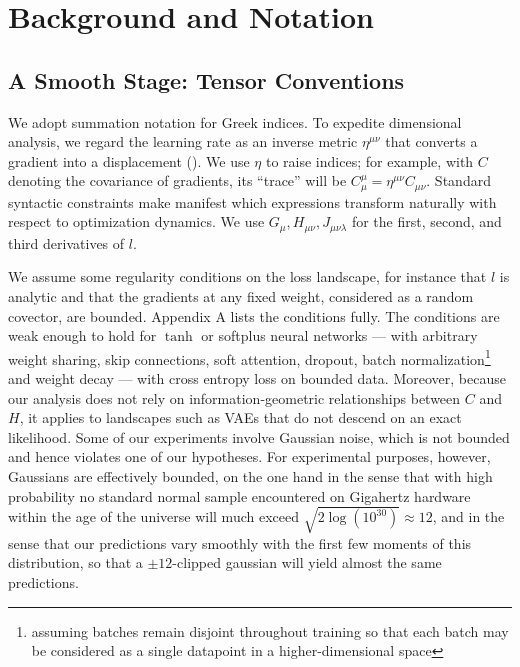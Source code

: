 \documentclass{article}
\begin{document}
\section{Background and Notation}


    \subsection{A Smooth Stage: Tensor Conventions}
        We adopt summation notation for Greek indices.  To expedite dimensional
        analysis, we regard the learning rate as an inverse metric
        $\eta^{\mu\nu}$ that converts a gradient into a displacement
        (\cite{bo13}).  We use $\eta$ to raise indices; for example, with $C$
        denoting the covariance of gradients, its ``trace'' will be
        $C^{\mu}_{\mu} = \eta^{\mu\nu} C_{\mu\nu}$.  Standard syntactic
        constraints make manifest which expressions transform naturally with
        respect to optimization dynamics.
        We use $G_\mu, H_{\mu\nu}, J_{\mu\nu\lambda}$ for the first, second,
        and third derivatives of $l$.

        We assume some regularity conditions on the loss landscape, for
        instance that $l$ is analytic and that the gradients at any fixed
        weight, considered as a random covector, are bounded.  Appendix A
        lists the conditions fully.  The conditions are weak enough to hold for
        $\tanh$ or softplus neural networks --- with arbitrary weight sharing,
        skip connections, soft attention, dropout, batch
        normalization\footnote{
            assuming batches remain disjoint throughout training so that each
            batch may be considered as a single datapoint in a
            higher-dimensional space 
        } and weight decay --- with cross
        entropy loss on bounded data.  Moreover, because our analysis does not
        rely on information-geometric relationships between $C$ and $H$, it
        applies to landscapes such as VAEs that do not descend on an exact
        likelihood.  
        Some of our experiments involve Gaussian noise, which is
        not bounded and hence violates one of our hypotheses.  For experimental 
        purposes, however, Gaussians are effectively bounded, on the one hand
        in the sense that with high probability no standard normal sample 
        encountered on Gigahertz hardware within the age of the universe
        will much exceed $\sqrt{2 \log(10^{30})} \approx 12$, and in the sense
        that our predictions vary smoothly with the first few moments of this
        distribution, so that a $\pm 12$-clipped gaussian will yield almost
        the same predictions.
\end{document}
